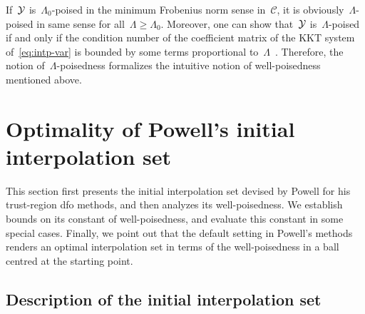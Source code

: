 \documentclass{article}
\numberwithin{equation}{section}
\theoremstyle{definition}
\theoremstyle{plain}
\theoremstyle{remark}
\newcommand*{\solvername}[1]{\textsc{#1}\xspace}
\newcommand*{\xpt}[1][]{\mathcal{Y}\ifblank{#1}{}{^{#1}}}
\begin{document}
If~$\xpt$ is~$\Lambda_0$-poised in the minimum Frobenius norm sense in~$\mathcal{C}$, it is obviously~$\Lambda$-poised in same sense for all~$\Lambda \ge \Lambda_0$.
Moreover, one can show that~$\xpt$ is~$\Lambda$-poised if and only if the condition number of the coefficient matrix of the KKT system of~\eqref{eq:intp-var} is bounded by some terms proportional to~$\Lambda$~\cite[Theorem~5.8]{Conn_Scheinberg_Vicente_2009}.
Therefore, the notion of~$\Lambda$-poisedness formalizes the intuitive notion of well-poisedness mentioned above.

\section{Optimality of Powell's initial interpolation set}
\label{sec:main-result}

This section first presents the initial interpolation set devised by Powell for his trust-region \gls{dfo} methods, and then analyzes its well-poisedness.
We establish bounds on its constant of well-poisedness, and evaluate this constant in some special cases.
Finally, we point out that the default setting in Powell's methods renders an optimal interpolation set in terms of the well-poisedness in a ball centred at the starting point.

\subsection{Description of the initial interpolation set}
\label{subsec:powell-set}
\end{document}
